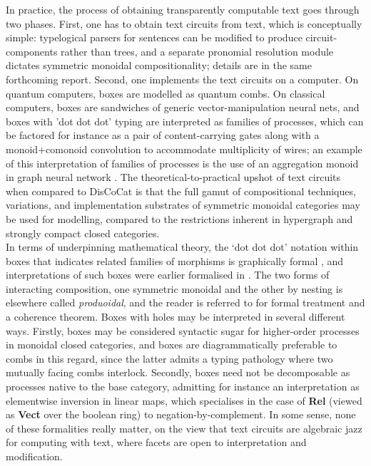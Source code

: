 In practice, the process of obtaining transparently computable text goes through two phases. First, one has to obtain text circuits from text, which is conceptually simple: typelogical parsers for sentences can be modified to produce circuit-components rather than trees, and a separate pronomial resolution module dictates symmetric monoidal compositionality; details are in the same forthcoming report. Second, one implements the text circuits on a computer. On quantum computers, boxes are modelled as quantum combs. On classical computers, boxes are sandwiches of generic vector-manipulation neural nets, and boxes with 'dot dot dot' typing are interpreted as families of processes, which can be factored for instance as a pair of content-carrying gates along with a monoid+comonoid convolution to accommodate multiplicity of wires; an example of this interpretation of families of processes is the use of an aggregation monoid in graph neural network \citep{dudzik_graph_2022}. The theoretical-to-practical upshot of text circuits when compared to DisCoCat is that the full gamut of compositional techniques, variations, and implementation substrates of symmetric monoidal categories may be used for modelling, compared to the restrictions inherent in hypergraph and strongly compact closed categories.\\

In terms of underpinning mathematical theory, the `dot dot dot' notation within boxes that indicates related families of morphisms is graphically formal \citep{wilson_string_2022}, and interpretations of such boxes were earlier formalised in \citep{merry_reasoning_2014,quick_-logic_2015,zamdzhiev_rewriting_2017}. The two forms of interacting composition, one symmetric monoidal and the other by nesting is elsewhere called \emph{produoidal}, and the reader is referred to \citep{earnshaw_produoidal_2023} for formal treatment and a coherence theorem. Boxes with holes may be interpreted in several different ways. Firstly, boxes may be considered syntactic sugar for higher-order processes in monoidal closed categories, and boxes are diagrammatically preferable to combs in this regard, since the latter admits a typing pathology where two mutually facing combs interlock. Secondly, boxes need not be decomposable as processes native to the base category, admitting for instance an interpretation as elementwise inversion in linear maps, which specialises in the case of \textbf{Rel} (viewed as \textbf{Vect} over the boolean ring) to negation-by-complement. In some sense, none of these formalities really matter, on the view that text circuits are algebraic jazz for computing with text, where facets are open to interpretation and modification.\\

